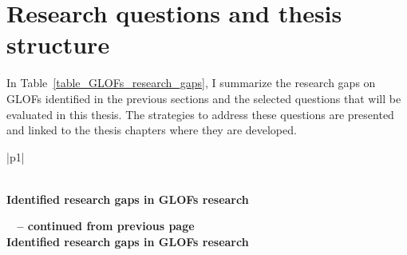 \section{Research questions and thesis structure}


In Table~\ref{table_GLOFs_research_gaps}, I summarize the research gaps on GLOFs identified in the previous sections and the selected questions that will be evaluated in this thesis. The strategies to address these questions are presented and linked to the thesis chapters where they are developed.


\begin{center}
\begin{longtable}{|p{}|}
\caption{Summary of the research gaps on GLOFs identified in this Introduction (with key supporting references) and proposed ways forward assessed in this thesis.} 
\label{table_GLOFs_research_gaps} \\

\hline
\textbf{Identified research gaps in GLOFs research} \\
\hline
\endfirsthead

%
{{\bfseries \tablename\ \thetable{} -- continued from previous page}} \\
\hline
\textbf{Identified research gaps in GLOFs research} \\
\hline
\endhead

\hline {} \\ \hline
\endfoot



\hline
\endlastfoot


\end{longtable}
\end{center}
